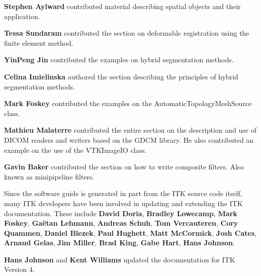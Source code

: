 {\bf Stephen Aylward} contributed material describing spatial objects and
their application.

{\bf Tessa Sundaram} contributed the section on deformable registration using
the finite element method.

{\bf YinPeng Jin} contributed the examples on  hybrid segmentation methods. 

{\bf Celina Imielinska} authored the section describing the principles of
hybrid segmentation methods.

{\bf Mark Foskey} contributed the examples on the
AutomaticTopologyMeshSource class.

{\bf Mathieu Malaterre} contributed the entire section on the description and
use of DICOM readers and writers based on the GDCM library. He also contributed
an example on the use of the VTKImageIO class.

{\bf Gavin Baker} contributed the section on how to write composite filters.
Also known as minipipeline filters.

Since the software guide is generated in part from the ITK source code
itself, many ITK developers have been involved in updating and
extending the ITK documentation.  These include {\bf David Doria},
{\bf Bradley Lowecamp}, {\bf Mark Foskey}, {\bf Ga\"{e}tan Lehmann},
{\bf Andreas Schuh}, {\bf Tom Vercauteren}, {\bf Cory Quammen}, {\bf Daniel Blezek},
{\bf Paul Hughett}, {\bf Matt McCormick}, {\bf Josh Cates}, {\bf Arnaud Gelas},
{\bf Jim Miller}, {\bf Brad King}, {\bf Gabe Hart}, {\bf Hans Johnson}.

{\bf Hans Johnson} and {\bf Kent Williams} updated the documentation for ITK Version 4.



